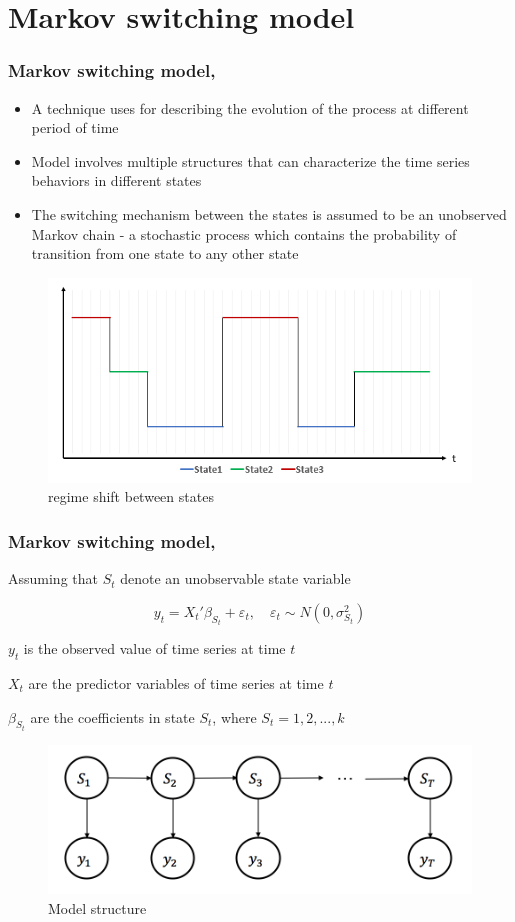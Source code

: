 \documentclass{beamer}
\begin{document}
\section{Markov switching model} %
\begin{frame}
	\frametitle{Markov switching model, \cite{p1}}
	\begin{itemize}
		\item A technique uses for describing the evolution of the process at different period of time
		\item Model involves multiple structures that can characterize the time series behaviors in different states
		\item The switching mechanism between the states is assumed to be an unobserved Markov chain - \footnotesize{a stochastic process which contains the probability of transition from one state to any other state}
	\end{itemize}

\begin{figure}
	\includegraphics[width=0.5\linewidth]{graph3}
	\caption{regime shift between states}
\end{figure}

\end{frame}

\begin{frame}
\frametitle{Markov switching model, \cite{p1}}
Assuming that $S_{t}$ denote an unobservable state variable

$$y_{t} = {X_{t}}'\beta_{S_{t}} + \varepsilon_{t}, \quad \varepsilon_{t} \sim N(0,\sigma^{2}_{S_{t}})$$

$y_{t}$ is the observed value of time series at time $t$ 

$X_{t}$ are the predictor variables of time series at time $t$ 

$\beta_{S_{t}}$ are the coefficients in state $S_{t}$, where $S_{t}=1,2,...,k$


\begin{figure}
	\includegraphics[width=0.5\linewidth]{msm}
	\caption{Model structure}
\end{figure}

\end{frame}
\end{document}
